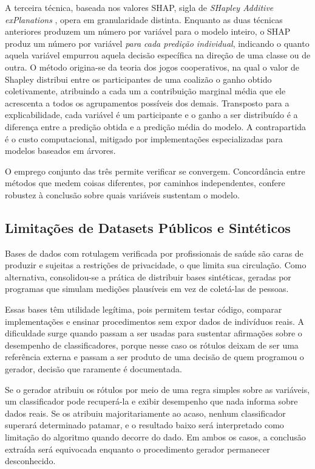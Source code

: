 A terceira técnica, baseada nos valores SHAP, sigla de \textit{SHapley Additive exPlanations} \cite{lundberg2017}, opera em granularidade distinta. Enquanto as duas técnicas anteriores produzem um número por variável para o modelo inteiro, o SHAP produz um número por variável \textit{para cada predição individual}, indicando o quanto aquela variável empurrou aquela decisão específica na direção de uma classe ou de outra. O método origina-se da teoria dos jogos cooperativos, na qual o valor de Shapley distribui entre os participantes de uma coalizão o ganho obtido coletivamente, atribuindo a cada um a contribuição marginal média que ele acrescenta a todos os agrupamentos possíveis dos demais. Transposto para a explicabilidade, cada variável é um participante e o ganho a ser distribuído é a diferença entre a predição obtida e a predição média do modelo. A contrapartida é o custo computacional, mitigado por implementações especializadas para modelos baseados em árvores.

O emprego conjunto das três permite verificar se convergem. Concordância entre métodos que medem coisas diferentes, por caminhos independentes, confere robustez à conclusão sobre quais variáveis sustentam o modelo.

\subsection{Limitações de Datasets Públicos e Sintéticos}
Bases de dados com rotulagem verificada por profissionais de saúde são caras de produzir e sujeitas a restrições de privacidade, o que limita sua circulação. Como alternativa, consolidou-se a prática de distribuir bases sintéticas, geradas por programas que simulam medições plausíveis em vez de coletá-las de pessoas.

Essas bases têm utilidade legítima, pois permitem testar código, comparar implementações e ensinar procedimentos sem expor dados de indivíduos reais. A dificuldade surge quando passam a ser usadas para sustentar afirmações sobre o desempenho de classificadores, porque nesse caso os rótulos deixam de ser uma referência externa e passam a ser produto de uma decisão de quem programou o gerador, decisão que raramente é documentada.

Se o gerador atribuiu os rótulos por meio de uma regra simples sobre as variáveis, um classificador pode recuperá-la e exibir desempenho que nada informa sobre dados reais. Se os atribuiu majoritariamente ao acaso, nenhum classificador superará determinado patamar, e o resultado baixo será interpretado como limitação do algoritmo quando decorre do dado. Em ambos os casos, a conclusão extraída será equivocada enquanto o procedimento gerador permanecer desconhecido.


